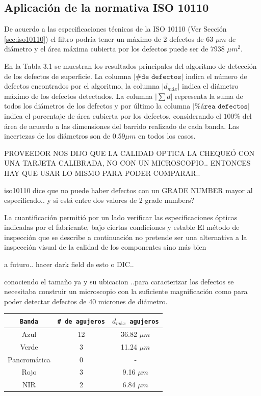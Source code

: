 \singlespacing
\subsection{Aplicación de la normativa ISO 10110}

De acuerdo a las especificaciones técnicas de la ISO 10110 (Ver Sección \ref{sec:iso10110}) el filtro podría tener un máximo de 2 defectos de 63 $\mu m$ de diámetro y el área máxima cubierta por los defectos puede ser de 7938 $\mu m^{2}$.

En la Tabla 3.1 se muestran los resultados principales del algoritmo de detección de los defectos de superficie. La columna $|\texttt{\# de defectos}|$ indica el número de defectos encontrados por el algoritmo, la columna $| d_{máx} |$ indica el diámetro máximo de los defectos detectados. La columna $| \sum d |$ representa la suma de todos los diámetros de los defectos y por último la columna $|\texttt{\% área defectos}|$ indica el porcentaje de área cubierta por los defectos, considerando el $100\%$ del área de acuerdo a las dimensiones del barrido realizado de cada banda. Las incertezas de los diámetros son de 0.59$\mu m$ en todos los casos.



PROVEEDOR NOS DIJO QUE LA CALIDAD OPTICA LA CHEQUEÓ CON UNA TARJETA CALIBRADA, NO CON UN MICROSCOPIO.. ENTONCES HAY QUE USAR LO MISMO PARA PODER COMPARAR..


iso10110 dice que no puede haber defectos con un GRADE NUMBER mayor al especificado.. y si está entre dos valores de 2 grade numbers?

La cuantificación permitió por un lado verificar las especificaciones ópticas indicadas por el fabricante, bajo ciertas condiciones y estable El método de inspección que se describe a continuación no pretende ser una alternativa a la inspección visual de la calidad de los componentes sino más bien 


a futuro.. hacer dark field de esto o DIC..

conociendo el tamaño ya y su ubicacion ..para caracterizar los defectos se necesitaba construir un microscopio con la suficiente magnificación como para poder detectar defectos de 40 micrones de diámetro.

\begin{table}[H]
\begin{center}

\begin{tabular}{ |c|c|c|}    \toprule
\texttt{Banda} & \texttt{\# de agujeros} & \texttt{$d_{máx}$ agujeros} \\\midrule
\rowcolor{blue!15} Azul   & 12  & 36.82 $\mu m$  \\ 
\rowcolor{green!50} Verde  & 3 & 11.24 $\mu m$ \\ 
Pancromática & 0 & - \\
\rowcolor{red!50} Rojo  & 3 & 9.16 $\mu m$ \\
\rowcolor{maroon!20} NIR   & 2 & 6.84 $\mu m$ \\
\bottomrule
 \hline
\end{tabular}
\end{center}
\end{table}


